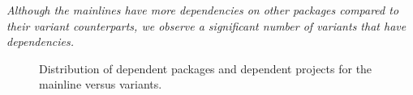 \begin{framed} 
\noindent
\emph{Although the mainlines have more dependencies on other packages compared to their variant counterparts, we observe a significant number of variants that have dependencies.}
\end{framed}

\begin{figure}[htbp]%
\vspace{-.3cm}
    \centering
    \qquad
    \caption{Distribution of dependent packages and dependent projects for the mainline versus variants.}%
    \label{fig:packages_and_projects}%
\end{figure}

